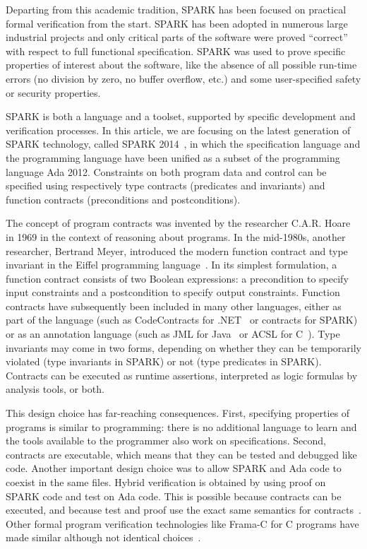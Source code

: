 \documentclass{llncs}
\begin{document}
Departing from this academic tradition, SPARK has been focused on practical
formal verification from the start. SPARK has been adopted in numerous large
industrial projects and only critical parts of the software were proved
``correct'' with respect to full functional specification. SPARK was used to
prove specific properties of interest about the software, like the absence of
all possible run-time errors (no division by zero, no buffer overflow, etc.) and
some user-specified safety or security properties.

SPARK is both a language and a toolset, supported by specific development and
verification processes. In this article, we are focusing on the latest
generation of SPARK technology, called SPARK 2014~\cite{sparkERTS2014}, in
which the specification language and the programming language have been unified
as a subset of the programming language Ada 2012. Constraints on both program
data and control can be specified using respectively type contracts (predicates
and invariants) and function contracts (preconditions and
postconditions).

The concept of program contracts was invented by the researcher C.A.R. Hoare in
1969 in the context of reasoning about programs. In the mid-1980s, another
researcher, Bertrand Meyer, introduced the modern function contract and type
invariant in the Eiffel programming language~\cite{meyer:1988:OSC}.  In its
simplest formulation, a function contract consists of two Boolean expressions:
a precondition to specify input constraints and a postcondition to specify
output constraints.  Function contracts have subsequently been included in many
other languages, either as part of the language (such as CodeContracts for
.NET~\cite{CodeContracts} or contracts for SPARK) or as an annotation language
(such as JML for Java~\cite{JML} or ACSL for C~\cite{acsl}). Type invariants
may come in two forms, depending on whether they can be temporarily violated
(type invariants in SPARK) or not (type predicates in SPARK). Contracts can be
executed as runtime assertions, interpreted as logic formulas by analysis
tools, or both.

This design choice has far-reaching consequences. First, specifying properties
of programs is similar to programming: there is no additional language to learn
and the tools available to the programmer also work on specifications. Second,
contracts are executable, which means that they can be tested and debugged like
code. Another important design choice was to allow SPARK and Ada code to
coexist in the same files. Hybrid verification is obtained by using proof on
SPARK code and test on Ada code. This is possible because contracts can be
executed, and because test and proof use the exact same semantics for
contracts~\cite{tseChalin10}. Other formal program verification technologies
like Frama-C for C programs have made similar although not identical
choices~\cite{kosmatov:hal-01344110}.
\end{document}
